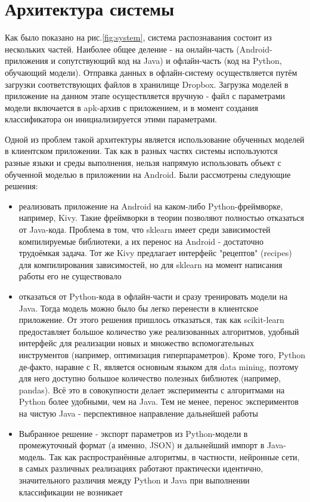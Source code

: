 
\section{Архитектура системы}

Как было показано на рис.\ref{fig:system}, система распознавания состоит из нескольких частей. Наиболее общее деление - на онлайн-часть (Android-приложения и сопутствующий код на Java) и офлайн-часть (код на Python, обучающий модели). Отправка данных в офлайн-систему осуществляется путём загрузки соответствующих файлов в хранилище Dropbox. Загрузка моделей в приложение на данном этапе осуществляется вручную - файл с параметрами модели включается в apk-архив с приложением, и в момент создания классификатора он инициализируется этими параметрами.

Одной из проблем такой архитектуры является использование обученных моделей в клиентском приложении. Так как в разных частях системы используются разные языки и среды выполнения, нельзя напрямую использовать объект с обученной моделью в приложении на Android. Были рассмотрены следующие решения:

\begin{itemize}
\item реализовать приложение на Android на каком-либо Python-фреймворке, например, Kivy. Такие фреймворки в теории позволяют полностью отказаться от Java-кода. Проблема в том, что sklearn имеет среди зависимостей компилируемые библиотеки, а их перенос на Android - достаточно трудоёмкая задача. Тот же Kivy предлагает интерфейс "рецептов" (recipes) для компилирования зависимостей, но для sklearn на момент написания работы его не существовало
\item отказаться от Python-кода в офлайн-части и сразу тренировать модели на Java. Тогда модель можно было бы легко перенести в клиентское приложение. От этого решения пришлось отказаться, так как scikit-learn предоставляет большое количество уже реализованных алгоритмов, удобный интерфейс для реализации новых и множество вспомогательных инструментов (например, оптимизация гиперпараметров). Кроме того, Python де-факто, наравне с R, является основным языком для data mining, поэтому для него доступно большое количество полезных библиотек (например, pandas). Всё это в совокупности делает эксперименты с алгоритмами на Python более удобными, чем на Java. Тем не менее, перенос экспериментов на чистую Java - перспективное направление дальнейшей работы
\item Выбранное решение - экспорт параметров из Python-модели в промежуточный формат (а именно, JSON) и дальнейший импорт в Java-модель. Так как распространённые алгоритмы, в частности, нейронные сети, в самых различных реализациях работают практически идентично, значительного различия между Python и Java при выполнении классификации не возникает
\end{itemize}

